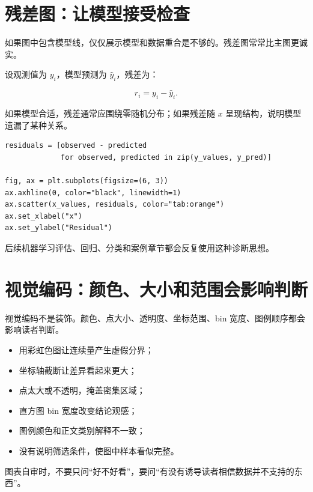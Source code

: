 \section{残差图：让模型接受检查}

如果图中包含模型线，仅仅展示模型和数据重合是不够的。残差图常常比主图更诚实。

设观测值为 \(y_i\)，模型预测为 \(\hat{y}_i\)，残差为：

\[
r_i = y_i - \hat{y}_i.
\]

如果模型合适，残差通常应围绕零随机分布；如果残差随 \(x\) 呈现结构，说明模型遗漏了某种关系。

\begin{examplebox}[最小残差计算]
\begin{lstlisting}[style=pythonstyle]
residuals = [observed - predicted
             for observed, predicted in zip(y_values, y_pred)]

fig, ax = plt.subplots(figsize=(6, 3))
ax.axhline(0, color="black", linewidth=1)
ax.scatter(x_values, residuals, color="tab:orange")
ax.set_xlabel("x")
ax.set_ylabel("Residual")
\end{lstlisting}
\end{examplebox}

后续机器学习评估、回归、分类和案例章节都会反复使用这种诊断思想。

\section{视觉编码：颜色、大小和范围会影响判断}

视觉编码不是装饰。颜色、点大小、透明度、坐标范围、bin 宽度、图例顺序都会影响读者判断。

\begin{warnbox}[视觉编码中的常见误导]
\begin{itemize}
    \item 用彩虹色图让连续量产生虚假分界；
    \item 坐标轴截断让差异看起来更大；
    \item 点太大或不透明，掩盖密集区域；
    \item 直方图 bin 宽度改变结论观感；
    \item 图例颜色和正文类别解释不一致；
    \item 没有说明筛选条件，使图中样本看似完整。
\end{itemize}
\end{warnbox}

图表自审时，不要只问“好不好看”，要问“有没有诱导读者相信数据并不支持的东西”。

